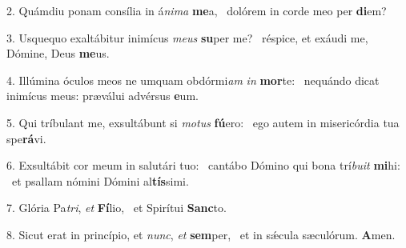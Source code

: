 2. Quámdiu ponam consília in á\textit{ni}\textit{ma} \textbf{me}a, \ast\  dolórem in corde meo per \textbf{di}em?\

3. Usquequo exaltábitur inimícus \textit{me}\textit{us} \textbf{su}per me? \ast\  réspice, et exáudi me, Dómine, Deus \textbf{me}us.\

4. Illúmina óculos meos ne umquam obdórmi\textit{am} \textit{in} \textbf{mor}te: \ast\  nequándo dicat inimícus meus: præválui advérsus \textbf{e}um.\

5. Qui tríbulant me, exsultábunt si \textit{mo}\textit{tus} \textbf{fú}ero: \ast\  ego autem in misericórdia tua spe\textbf{rá}vi.\

6. Exsultábit cor meum in salutári tuo: \dag\  cantábo Dómino qui bona trí\textit{bu}\textit{it} \textbf{mi}hi: \ast\  et psallam nómini Dómini al\textbf{tís}simi.\

7. Glória Pa\textit{tri}, \textit{et} \textbf{Fí}lio, \ast\  et Spirítui \textbf{Sanc}to.\

8. Sicut erat in princípio, et \textit{nunc}, \textit{et} \textbf{sem}per, \ast\  et in sǽcula sæculórum. \textbf{A}men.\


